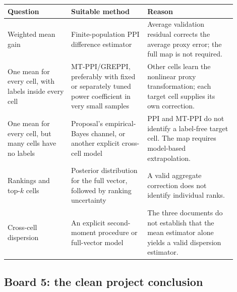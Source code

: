 \documentclass[11pt]{article}
\begin{document}
  \begin{center}
  \begin{tabular}{>{\raggedright\arraybackslash}p{0.25\linewidth}
                  >{\raggedright\arraybackslash}p{0.30\linewidth}
                  >{\raggedright\arraybackslash}p{0.35\linewidth}}
  \toprule
  Question & Suitable method & Reason \\
  \midrule
  Weighted mean gain &
  Finite-population PPI difference estimator &
  Average validation residual corrects the average proxy error; the full map is
  not required. \\
  \addlinespace
  One mean for every cell, with labels inside every cell &
  MT-PPI/GREPPI, preferably with fixed or separately tuned power coefficient in
  very small samples &
  Other cells learn the nonlinear proxy transformation; each target cell
  supplies its own correction. \\
  \addlinespace
  One mean for every cell, but many cells have no labels &
  Proposal's empirical-Bayes channel, or another explicit cross-cell model &
  PPI and MT-PPI do not identify a label-free target cell. The map requires
  model-based extrapolation. \\
  \addlinespace
  Rankings and top-\(k\) cells &
  Posterior distribution for the full vector, followed by ranking uncertainty &
  A valid aggregate correction does not identify individual ranks. \\
  \addlinespace
  Cross-cell dispersion &
  An explicit second-moment procedure or full-vector model &
  The three documents do not establish that the mean estimator alone yields a
  valid dispersion estimator. \\
  \bottomrule
  \end{tabular}
  \end{center}
  
  \subsection*{Board 5: the clean project conclusion}
  
\end{document}
